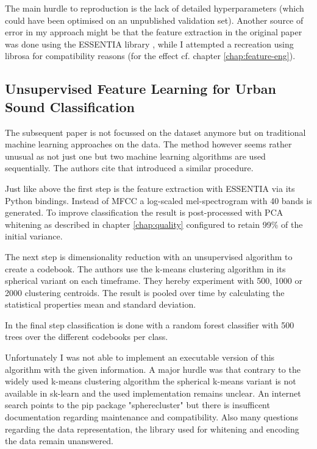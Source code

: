 The main hurdle to reproduction is the lack of detailed hyperparameters (which could have been optimised on an unpublished validation set). Another source of error in my approach might be that the feature extraction in the original paper was done using the ESSENTIA library \cite{bogdanov:Essentia:ACMMULTIMEDIA13}, while I attempted a recreation using librosa for compatibility reasons (for the effect cf. chapter \ref{chap:feature-eng}).

\subsection{Unsupervised Feature Learning for Urban Sound Classification}
\label{7177954}

The subsequent paper \cite{7177954} is not focussed on the dataset anymore but on traditional machine learning approaches on the data. The method however seems rather unusual as not just one but two machine learning algorithms are used sequentially. The authors cite \cite{Coates2012} that introduced a similar procedure.


Just like above the first step is the feature extraction with ESSENTIA via its Python bindings. Instead of MFCC a log-scaled mel-spectrogram with 40 bands is generated. To improve classification the result is post-processed with PCA whitening as described in chapter \ref{chap:quality} configured to retain 99\% of the initial variance.

The next step is dimensionality reduction with an unsupervised algorithm to create a codebook. The authors use the k-means clustering algorithm in its spherical variant on each timeframe. They hereby experiment with 500, 1000 or 2000 clustering centroids. The result is pooled over time by calculating the statistical properties mean and standard deviation.

In the final step classification is done with a random forest classifier with 500 trees over the different codebooks per class.

Unfortunately I was not able to implement an executable version of this algorithm with the given information. A major hurdle was that contrary to the widely used k-means clustering algorithm the spherical k-means variant is not available in sk-learn and the used implementation remains unclear. An internet search points to the pip package "spherecluster" but there is insufficent documentation regarding maintenance and compatibility. Also many questions regarding the data representation, the library used for whitening and encoding the data remain unanswered.


